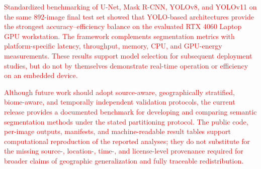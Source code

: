 \documentclass[journal,article,submit,pdftex,moreauthors]{Definitions/mdpi}
\begin{document}
\textcolor{red}{Standardized benchmarking of U-Net, Mask R-CNN, YOLOv8, and YOLOv11 on the same 892-image final test set showed that YOLO-based architectures provide the strongest accuracy--efficiency balance on the evaluated RTX 4060 Laptop GPU workstation. The framework complements segmentation metrics with platform-specific latency, throughput, memory, CPU, and GPU-energy measurements. These results support model selection for subsequent deployment studies, but do not by themselves demonstrate real-time operation or efficiency on an embedded device.}


\textcolor{red}{Although future work should adopt source-aware, geographically stratified, biome-aware, and temporally independent validation protocols, the current release provides a documented benchmark for developing and comparing semantic segmentation methods under the stated partitioning protocol. The public code, per-image outputs, manifests, and machine-readable result tables support computational reproduction of the reported analyses; they do not substitute for the missing source-, location-, time-, and license-level provenance required for broader claims of geographic generalization and fully traceable redistribution.}


\vspace{6pt} 



\end{document}
